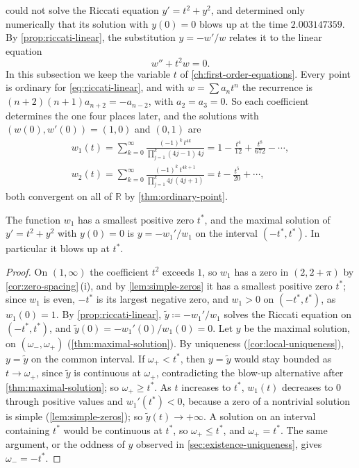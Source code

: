  could not solve the Riccati equation $y'=t^2+y^2$, and determined only numerically that its solution with $y(0)=0$ blows up at the time $2.003147359$. By \cref{prop:riccati-linear}, the substitution $y=-w'/w$ relates it to the linear equation
\begin{equation}
w''+t^2w=0 .
\label{eq:riccati-linear}
\end{equation}
In this subsection we keep the variable $t$ of \cref{ch:first-order-equations}. Every point is ordinary for \eqref{eq:riccati-linear}, and with $w=\sum a_nt^n$ the recurrence is $(n+2)(n+1)a_{n+2}=-a_{n-2}$, with $a_2=a_3=0$. So each coefficient determines the one four places later, and the solutions with $(w(0),w'(0))=(1,0)$ and $(0,1)$ are
\begin{equation}
\begin{gathered}
w_1(t)=\sum_{k=0}^\infty\frac{(-1)^k\,t^{4k}}{\prod_{j=1}^k(4j-1)\,4j}=1-\frac{t^4}{12}+\frac{t^8}{672}-\cdots,\\
w_2(t)=\sum_{k=0}^\infty\frac{(-1)^k\,t^{4k+1}}{\prod_{j=1}^k4j\,(4j+1)}=t-\frac{t^5}{20}+\cdots ,
\end{gathered}
\label{eq:riccati-series}
\end{equation}
both convergent on all of $\mathbb R$ by \cref{thm:ordinary-point}.

\begin{proposition}
\label{prop:riccati-blowup}
The function $w_1$ has a smallest positive zero $t^*$, and the maximal solution of $y'=t^2+y^2$ with $y(0)=0$ is $y=-w_1'/w_1$ on the interval $(-t^*,t^*)$. In particular it blows up at $t^*$.
\end{proposition}

\begin{proof}
On $(1,\infty)$ the coefficient $t^2$ exceeds $1$, so $w_1$ has a zero in $(2,2+\pi)$ by \cref{cor:zero-spacing}\,(i), and by \cref{lem:simple-zeros} it has a smallest positive zero $t^*$; since $w_1$ is even, $-t^*$ is its largest negative zero, and $w_1>0$ on $(-t^*,t^*)$, as $w_1(0)=1$. By \cref{prop:riccati-linear}, $\tilde y\coloneqq-w_1'/w_1$ solves the Riccati equation on $(-t^*,t^*)$, and $\tilde y(0)=-w_1'(0)/w_1(0)=0$. Let $y$ be the maximal solution, on $(\omega_-,\omega_+)$ (\cref{thm:maximal-solution}). By uniqueness (\cref{cor:local-uniqueness}), $y=\tilde y$ on the common interval. If $\omega_+<t^*$, then $y=\tilde y$ would stay bounded as $t\to\omega_+$, since $\tilde y$ is continuous at $\omega_+$, contradicting the blow-up alternative after \cref{thm:maximal-solution}; so $\omega_+\ge t^*$. As $t$ increases to $t^*$, $w_1(t)$ decreases to $0$ through positive values and $w_1'(t^*)<0$, because a zero of a nontrivial solution is simple (\cref{lem:simple-zeros}); so $\tilde y(t)\to+\infty$. A solution on an interval containing $t^*$ would be continuous at $t^*$, so $\omega_+\le t^*$, and $\omega_+=t^*$. The same argument, or the oddness of $y$ observed in \cref{sec:existence-uniqueness}, gives $\omega_-=-t^*$.
\end{proof}

